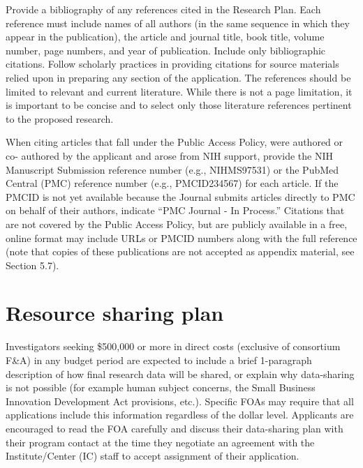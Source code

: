 \documentclass[12pt]{article}
\newcommand{\instructions}[1]{}
\renewcommand{\instructions}[1]{{\scriptsize \sc #1}}
\begin{document}
\clearpage

\instructions{Provide a bibliography of any references cited in the
  Research Plan. Each reference must include names of all authors (in
  the same sequence in which they appear in the publication), the
  article and journal title, book title, volume number, page numbers,
  and year of publication. Include only bibliographic
  citations. Follow scholarly practices in providing citations for
  source materials relied upon in preparing any section of the
  application.  The references should be limited to relevant and
  current literature. While there is not a page limitation, it is
  important to be concise and to select only those literature
  references pertinent to the proposed research.}

\instructions{When citing articles that fall under the Public Access
  Policy, were authored or co- authored by the applicant and arose
  from NIH support, provide the NIH Manuscript Submission reference
  number (e.g., NIHMS97531) or the PubMed Central (PMC) reference
  number (e.g., PMCID234567) for each article. If the PMCID is not yet
  available because the Journal submits articles directly to PMC on
  behalf of their authors, indicate ``PMC Journal - In Process.''
  Citations that are not covered by the Public Access Policy, but are
  publicly available in a free, online format may include URLs or
  PMCID numbers along with the full reference (note that copies of
  these publications are not accepted as appendix material, see
  Section 5.7).}


\renewcommand{\refname}{Bibliography \& References Cited}


\clearpage
\section*{Resource sharing plan}

\instructions{Investigators seeking \$500,000 or more in direct costs
  (exclusive of consortium F\&A) in any budget period are expected to
  include a brief 1-paragraph description of how final research data
  will be shared, or explain why data-sharing is not possible (for
  example human subject concerns, the Small Business Innovation
  Development Act provisions, etc.). Specific FOAs may require that
  all applications include this information regardless of the dollar
  level. Applicants are encouraged to read the FOA carefully and
  discuss their data-sharing plan with their program contact at the
  time they negotiate an agreement with the Institute/Center (IC)
  staff to accept assignment of their application.}
\end{document}
